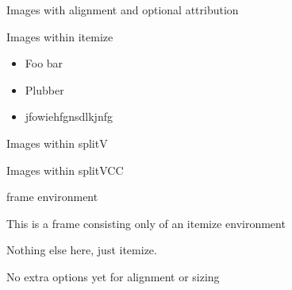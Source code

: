 \documentclass[11pt,compress,t,notes=noshow, xcolor=table]{beamer}
\begin{document}
\begin{frame}{Images with alignment and optional attribution}
  
  
  
\end{frame}


\begin{frame}{Images within itemize}
  
  \begin{itemize}
    \item Foo bar
    \item Plubber
    \item jfowiehfgnsdlkjnfg
  \end{itemize}
  
  
\end{frame}


\begin{frame}[allowframebreaks]{Images within splitV}
  
  
  \vfill
  
  
\end{frame}


\begin{frame}[allowframebreaks]{Images within splitVCC}
  
  
  \vfill
  
  
\end{frame}


\begin{framei}{frame environment}
  \item This is a frame consisting only of an itemize environment
  \item Nothing else here, just itemize.
  \item No extra options yet for alignment or sizing
\end{framei}

\endlecture
\end{document}
